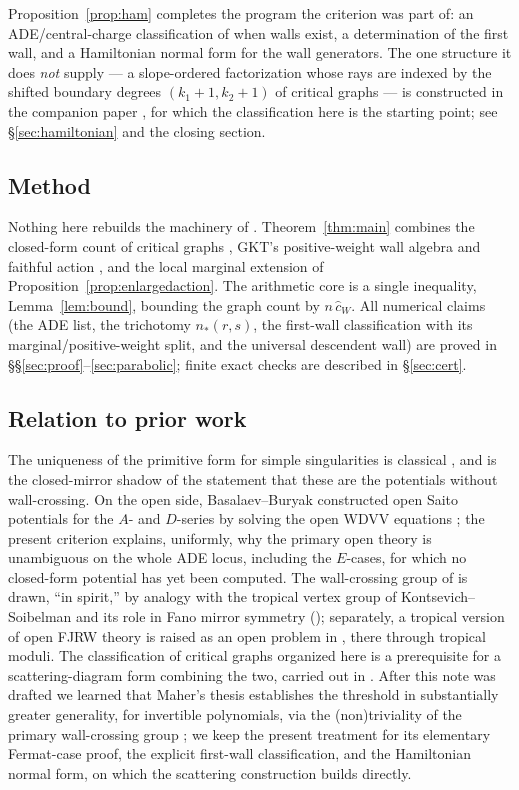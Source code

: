 \documentclass[11pt]{amsart}
\theoremstyle{definition}
\theoremstyle{remark}
\newcommand{\chat}{\hat{c}}
\begin{document}
Proposition~\ref{prop:ham} completes the program the criterion was part of: an
ADE/central-charge classification of when walls exist, a determination of the
first wall, and a Hamiltonian normal form for the wall generators. The one
structure it does \emph{not} supply --- a slope-ordered factorization whose rays
are indexed by the shifted boundary degrees $(k_1+1,k_2+1)$ of critical graphs
--- is constructed in the companion paper \cite{companion}, for which the
classification here is the starting point; see
\S\ref{sec:hamiltonian} and the closing section.

\subsection*{Method}
Nothing here rebuilds the machinery of \cite{GKT}. Theorem~\ref{thm:main}
combines the closed-form count of critical graphs
\cite[Notation~2.40]{GKT}, GKT's positive-weight wall algebra and faithful
action \cite[Definition~4.23 and Theorem~4.27]{GKT}, and the local marginal
extension of Proposition~\ref{prop:enlargedaction}. The arithmetic core is a
single inequality, Lemma~\ref{lem:bound}, bounding the
graph count by $n\,\chat_{W}$. All numerical claims (the ADE list, the trichotomy
$n_{*}(r,s)$, the first-wall classification with its marginal/positive-weight split, and the
universal descendent wall) are proved in
\S\S\ref{sec:proof}--\ref{sec:parabolic}; finite exact checks are described in
\S\ref{sec:cert}.

\subsection*{Relation to prior work}
The uniqueness of the primitive form for simple singularities is classical
\cite{Saito83,NoumiYamada98}, and is the closed-mirror shadow of the statement
that these are the potentials without wall-crossing. On the open side,
Basalaev--Buryak constructed open Saito potentials for the $A$- and $D$-series
by solving the open WDVV equations \cite{BB21}; the present criterion explains,
uniformly, why the primary open theory is unambiguous on the whole ADE locus,
including the $E$-cases, for which no closed-form potential has yet been
computed. The wall-crossing group of \cite{GKT} is drawn, ``in spirit,'' by analogy
with the tropical vertex group of Kontsevich--Soibelman \cite{KS06} and its role
in Fano mirror symmetry \cite{Gross10} (\cite[Remark~0.8]{GKT}); separately, a
tropical version of open FJRW theory is raised as an open problem in
\cite[\S6]{GKTsurvey}, there through tropical moduli. The classification of critical
graphs organized here is a prerequisite for a scattering-diagram form combining
the two, carried out in \cite{companion}. After this note was drafted we
learned that Maher's thesis establishes the threshold in substantially greater
generality, for invertible polynomials, via the (non)triviality of the
primary wall-crossing group \cite[Proposition~1.0.5]{Maher}; we keep the
present treatment for its elementary Fermat-case proof, the explicit first-wall
classification, and the Hamiltonian normal form, on which the scattering construction
builds directly.
\end{document}
